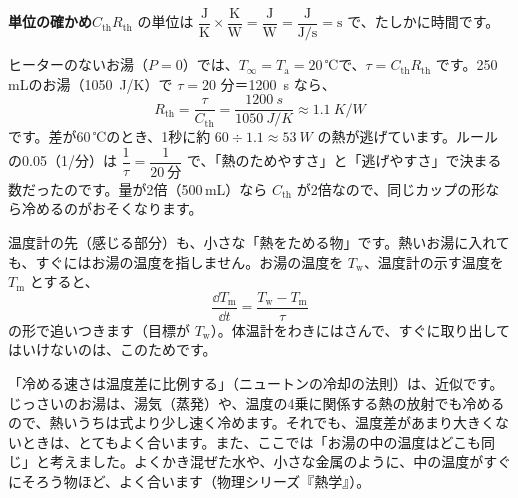 \noindent\textbf{単位の確かめ}\quad $C_{\mathrm{th}}R_{\mathrm{th}}$ の単位は $\dfrac{\text{J}}{\text{K}}\times\dfrac{\text{K}}{\text{W}}=\dfrac{\text{J}}{\text{W}}=\dfrac{\text{J}}{\text{J/s}}=\text{s}$ で、たしかに時間です。

ヒーターのないお湯（$P=0$）では、$T_\infty=T_{\mathrm a}=20$\,℃で、$\tau=C_{\mathrm{th}}R_{\mathrm{th}}$ です。250\,mLのお湯（\qty{1050}{J/K}）で $\tau=20$ 分＝\qty{1200}{s} なら、
\[ R_{\mathrm{th}}=\frac{\tau}{C_{\mathrm{th}}}=\frac{\qty{1200}{s}}{\qty{1050}{J/K}}\approx\qty{1.1}{K/W} \]
です。差が60\,℃のとき、1秒に約 $60\div1.1\approx\qty{53}{W}$ の熱が逃げています。ルールの0.05（1/分）は $\dfrac{1}{\tau}=\dfrac{1}{20\ \text{分}}$ で、「熱のためやすさ」と「逃げやすさ」で決まる数だったのです。量が2倍（500\,mL）なら $C_{\mathrm{th}}$ が2倍なので、同じカップの形なら冷めるのがおそくなります。

温度計の先（感じる部分）も、小さな「熱をためる物」です。熱いお湯に入れても、すぐにはお湯の温度を指しません。お湯の温度を $T_{\mathrm w}$、温度計の示す温度を $T_{\mathrm m}$ とすると、
\[ \frac{\dd T_{\mathrm m}}{\dd t}=\frac{T_{\mathrm w}-T_{\mathrm m}}{\tau} \]
の形で追いつきます（目標が $T_{\mathrm w}$）。体温計をわきにはさんで、すぐに取り出してはいけないのは、このためです。

\begin{seikaku}
「冷める速さは温度差に比例する」（ニュートンの冷却の法則）は、近似です。じっさいのお湯は、湯気（蒸発）や、温度の4乗に関係する熱の放射でも冷めるので、熱いうちは式より少し速く冷めます。それでも、温度差があまり大きくないときは、とてもよく合います。また、ここでは「お湯の中の温度はどこも同じ」と考えました。よくかき混ぜた水や、小さな金属のように、中の温度がすぐにそろう物ほど、よく合います（物理シリーズ『熱学』）。
\end{seikaku}

